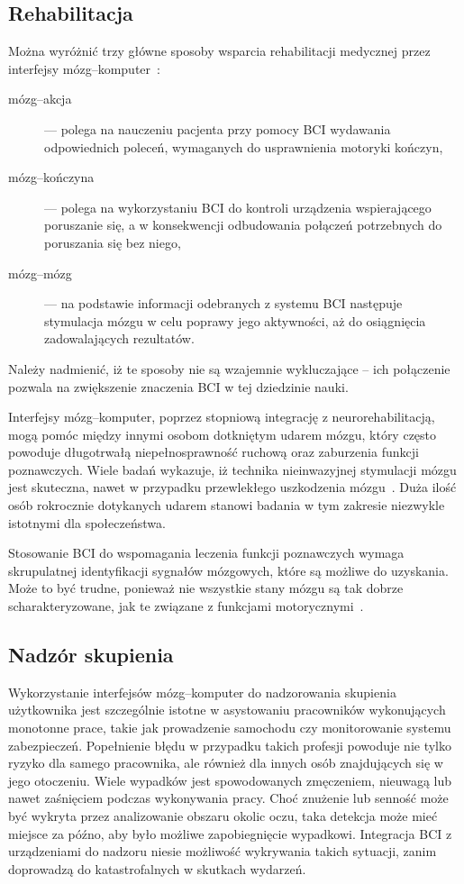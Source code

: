 \documentclass[skorowidz,skroty]{dyplomWEZUT}
\begin{document}
\subsection{Rehabilitacja}
Można wyróżnić trzy główne sposoby wsparcia rehabilitacji medycznej przez interfejsy mózg--komputer~\cite{bci_lab}:
\begin{description}
    \item [mózg--akcja] --- polega na nauczeniu pacjenta przy pomocy BCI wydawania odpowiednich poleceń, wymaganych do usprawnienia motoryki kończyn,
    \item [mózg--kończyna] --- polega na wykorzystaniu BCI do kontroli urządzenia wspierającego poruszanie się, a w konsekwencji odbudowania połączeń potrzebnych do poruszania się bez niego,
    \item [mózg--mózg] --- na podstawie informacji odebranych z systemu BCI następuje stymulacja mózgu w celu poprawy jego aktywności, aż do osiągnięcia zadowalających rezultatów.
\end{description}
Należy nadmienić, iż te sposoby nie są wzajemnie wykluczające -- ich połączenie pozwala na zwiększenie znaczenia BCI w tej dziedzinie nauki.

Interfejsy mózg--komputer, poprzez stopniową integrację z neurorehabilitacją, mogą pomóc między innymi osobom dotkniętym udarem mózgu, który często powoduje długotrwałą niepełnosprawność ruchową oraz zaburzenia funkcji poznawczych. Wiele badań wykazuje, iż technika nieinwazyjnej stymulacji mózgu jest skuteczna, nawet w przypadku przewlekłego uszkodzenia mózgu~\cite{bci_lab}. Duża ilość osób rokrocznie dotykanych udarem stanowi badania w tym zakresie niezwykle istotnymi dla społeczeństwa.

Stosowanie BCI do wspomagania leczenia funkcji poznawczych wymaga skrupulatnej identyfikacji sygnałów mózgowych, które są możliwe do uzyskania. Może to być trudne, ponieważ nie wszystkie stany mózgu są tak dobrze scharakteryzowane, jak te związane z funkcjami motorycznymi~\cite{bci_handbook}.


\subsection{Nadzór skupienia}
Wykorzystanie interfejsów mózg--komputer do nadzorowania skupienia użytkownika jest szczególnie istotne w asystowaniu pracowników wykonujących monotonne prace, takie jak prowadzenie samochodu czy monitorowanie systemu zabezpieczeń. Popełnienie błędu w przypadku takich profesji powoduje nie tylko ryzyko dla samego pracownika, ale również dla innych osób znajdujących się w jego otoczeniu. Wiele wypadków jest spowodowanych zmęczeniem, nieuwagą lub nawet zaśnięciem podczas wykonywania pracy. Choć znużenie lub senność może być wykryta przez analizowanie obszaru okolic oczu, taka detekcja może mieć miejsce za późno, aby było możliwe zapobiegnięcie wypadkowi. Integracja BCI z urządzeniami do nadzoru niesie możliwość wykrywania takich sytuacji, zanim doprowadzą do katastrofalnych w skutkach wydarzeń. 
\end{document}
